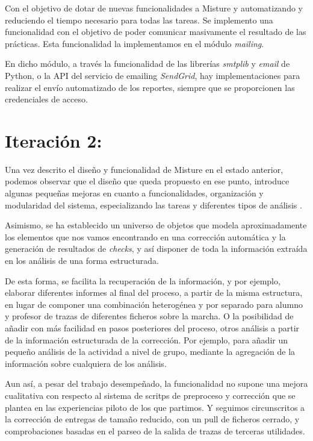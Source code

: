 Con el objetivo de dotar de nuevas funcionalidades a Misture y automatizando y reduciendo el tiempo necesario para todas las tareas. Se implemento una funcionalidad con el objetivo de poder comunicar masivamente el resultado de las prácticas. Esta funcionalidad la implementamos en el módulo \textit{mailing}.

En dicho módulo, a través la funcionalidad de las librerías \textit{smtplib} y \textit{email} de Python, o la API del servicio de emailing \textit{SendGrid}, hay implementaciones para realizar el envío automatizado de los reportes, siempre que se proporcionen las credenciales de acceso.	\newpage %

\section{Iteración 2:} 
\label{subsec:iteracion2}

Una vez descrito el diseño y funcionalidad de Misture en el estado anterior, podemos observar que el diseño que queda propuesto en ese punto, introduce algunas pequeñas mejoras en cuanto a funcionalidades, organización y modularidad del sistema, especializando las tareas y diferentes tipos de análisis .


Asimismo, se ha establecido un universo de objetos que modela aproximadamente los elementos que nos vamos encontrando en una corrección automática y la generación de resultados de \textit{checks}, y así disponer de toda la información extraída en los análisis de una forma estructurada.


De esta forma, se facilita la recuperación de la información, y por ejemplo, elaborar diferentes informes al final del proceso, a partir de la misma estructura, en lugar de componer  una combinación heterogénea y por separado para alumno y profesor de trazas de diferentes ficheros sobre la marcha. O la posibilidad de añadir con más facilidad en pasos posteriores del proceso, otros análisis a partir de la información estructurada de la corrección. Por ejemplo, para añadir un pequeño análisis de la actividad a nivel de grupo, mediante la agregación de la información sobre cualquiera de los análisis.


Aun así, a pesar del trabajo desempeñado, la funcionalidad no supone una mejora cualitativa con respecto al sistema de scritps de preproceso y corrección que se plantea en las experiencias piloto de los que partimos. Y seguimos circunscritos a la corrección de entregas de tamaño reducido, con un pull de ficheros cerrado, y comprobaciones basadas en el parseo de la salida de trazas de terceras utilidades.


